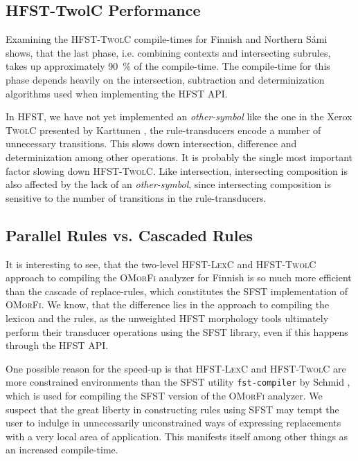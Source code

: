 \documentclass[a4paper]{article}
\begin{document}
\subsection{HFST-TwolC Performance} 

Examining the \textsc{HFST-TwolC} compile-times for Finnish and
Northern S\'ami shows, that the last phase, i.e. combining contexts
and intersecting subrules, takes up approximately 90~\% of the
compile-time. The compile-time for this phase depends heavily on the
intersection, subtraction and determinization algorithms used when
implementing the \textsc{HFST} API.

In \textsc{HFST}, we have not yet implemented an \textit{other-symbol}
like the one in the Xerox \textsc{TwolC} presented by Karttunen
\cite{Karttunen92}, the rule-transducers encode a number of
unnecessary transitions.  This slows down intersection, difference and
determinization among other operations. It is probably the single most
important factor slowing down \textsc{HFST-TwolC}. Like intersection,
intersecting composition is also affected by the lack of an
\textit{other-symbol}, since intersecting composition is sensitive to
the number of transitions in the rule-transducers.

\subsection{Parallel Rules vs. Cascaded Rules} 

It is interesting to see, that the two-level \textsc{HFST-LexC} and
\textsc{HFST-TwolC} approach to compiling the \textsc{OMorFi} analyzer
for Finnish is so much more efficient than the cascade of
replace-rules, which constitutes the \textsc{SFST} implementation of
\textsc{OMorFi}. We know, that the difference lies in the approach to
compiling the lexicon and the rules, as the unweighted \textsc{HFST}
morphology tools ultimately perform their transducer operations using
the \textsc{SFST} library, even if this happens through the
\textsc{HFST} API.

One possible reason for the speed-up is that \textsc{HFST-LexC} and
\textsc{HFST-TwolC} are more constrained environments than the
\textsc{SFST} utility \texttt{fst-compiler} by Schmid \cite{sfst},
which is used for compiling the \textsc{SFST} version of the
\textsc{OMorFi} analyzer. We suspect that the great liberty in
constructing rules using \textsc{SFST} may tempt the user to indulge
in unnecessarily unconstrained ways of expressing replacements with a
very local area of application. This manifests itself among other
things as an increased compile-time.
\end{document}
